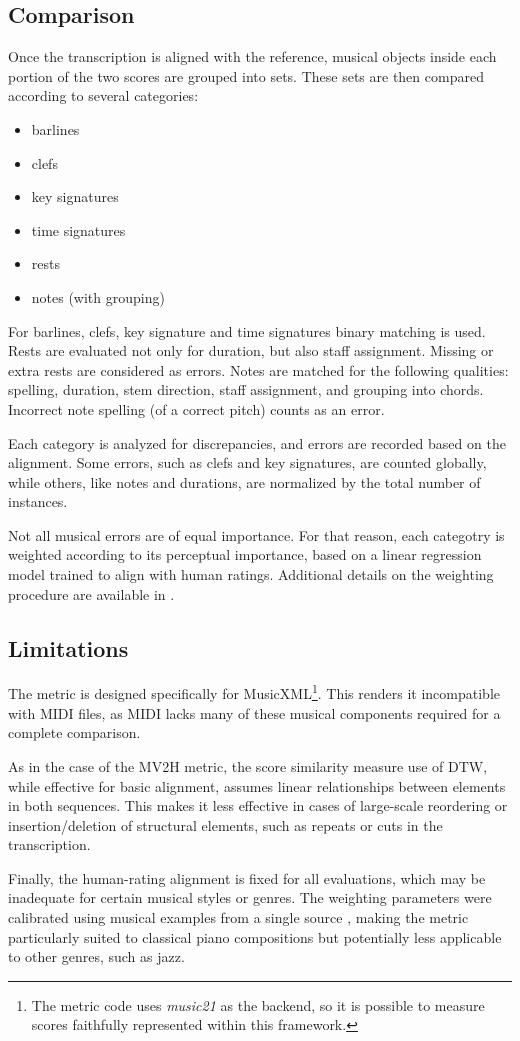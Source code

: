 \subsection{Comparison}

Once the transcription is aligned with the reference, musical objects inside each portion of the two scores are grouped into sets. These sets are then compared according to several categories: \begin{itemize}
	\item barlines
	\item clefs
	\item key signatures
	\item time signatures
	\item rests
	\item notes (with grouping)
\end{itemize}

For barlines, clefs, key signature and time signatures binary matching is used. Rests are evaluated not only for duration, but also staff assignment. Missing or extra rests are considered as errors. Notes are matched for the following qualities: spelling, duration, stem direction, staff assignment, and grouping into chords. Incorrect note spelling (of a correct pitch) counts as an error.

Each category is analyzed for discrepancies, and errors are recorded based on the alignment. Some errors, such as clefs and key signatures, are counted globally, while others, like notes and durations, are normalized by the total number of instances.

Not all musical errors are of equal importance. For that reason, each categotry is weighted according to its perceptual importance, based on a linear regression model trained to align with human ratings. Additional details on the weighting procedure are available in \cite[p. 410--411]{Cogliati2017}.

\subsection{Limitations}

The metric is designed specifically for MusicXML\footnote{The metric code uses \emph{music21} \cite{Cuthbert2010} as the backend, so it is possible to measure scores faithfully represented within this framework.}. This renders it incompatible with MIDI files, as MIDI lacks many of these musical components required for a complete comparison.

As in the case of the MV2H metric, the score similarity measure use of DTW, while effective for basic alignment, assumes linear relationships between elements in both sequences. This makes it less effective in cases of large-scale reordering or insertion/deletion of structural elements, such as repeats or cuts in the transcription.

Finally, the human-rating alignment is fixed for all evaluations, which may be inadequate for certain musical styles or genres. The weighting parameters were calibrated using musical examples from a single source \cite{Kostka1994}, making the metric particularly suited to classical piano compositions but potentially less applicable to other genres, such as jazz.
